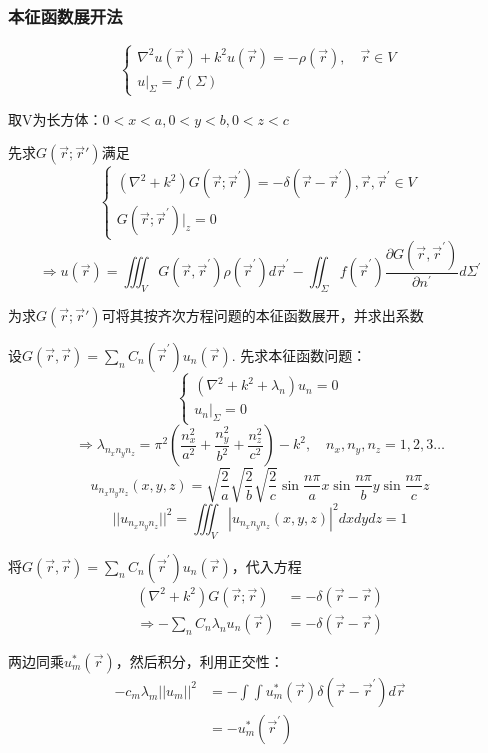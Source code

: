 \subsubsection{本征函数展开法}
\begin{ex}
$$\begin{cases}\nabla^{2}u(\vec{r})+k^{2}u(\vec{r})=-\rho(\vec{r}),\quad\vec{r}\in V\\u|_{\Sigma}=f(\Sigma)\end{cases}$$

取V为长方体：$0<x<a, 0<y<b, 0<z<c$

先求$G(\vec{r};\vec{r}')$满足
$$\begin{cases}(\nabla^{2}+k^{2})G(\vec{r};\vec{r}^{\prime})=-\delta(\vec{r}-\vec{r}^{\prime}),\vec{r},\vec{r}^{\prime}\in V\\G(\vec{r};\vec{r}^{\prime})|_{z}=0\end{cases}$$
$$\Rightarrow u(\vec{r})=\iiint_{V}G(\vec{r},\vec{r}^{\prime})\rho(\vec{r}^{\prime})d\vec{r}^{\prime}-\iint_{\Sigma}f(\vec{r}^{\prime})\frac{\partial G(\vec{r},\vec{r}^{\prime})}{\partial n^{\prime}}d\Sigma^{\prime}$$

为求$G(\vec{r};\vec{r}')$可将其按齐次方程问题的本征函数展开，并求出系数

设$G(\vec{r},\vec{r})=\sum_{n}C_{n}(\vec{r}^{\prime})u_{n}(\vec{r})$. 先求本征函数问题：$$\begin{cases}(\nabla^{2}+k^{2}+\lambda_{n})u_{n}=0\\u_{n}|_{\Sigma}=0\end{cases}$$
$$\Rightarrow\lambda_{n_{x}n_{y}n_{z}}=\pi^{2}(\frac{n_{x}^{2}}{a^{2}}+\frac{n_{y}^{2}}{b^{2}}+\frac{n_{z}^{2}}{c^{2}})-k^{2},\quad n_x,n_y,n_z=1,2,3\ldots $$
$$u_{n_{x}n_{y}n_{z}}(x,y,z)=\sqrt{\frac{2}{a}}\sqrt{\frac{2}{b}}\sqrt{\frac{2}{c}}\sin\frac{n\pi}{a}x\sin\frac{n\pi}{b}y\sin\frac{n\pi}{c}z$$
$$||u_{n_{x}n_{y}n_{z}}||^{2}=\iiint_V|u_{n_{x}n_{y}n_{z}}(x,y,z)|^{2}dxdydz=1$$

将$G(\vec{r},\vec{r})=\sum_{n}C_{n}(\vec{r}^{\prime})u_{n}(\vec{r})$，代入方程
$$\begin{aligned}
    (\nabla^{2}+k^{2})G(\vec{r};\vec{r})&=-\delta(\vec{r}-\vec{r})\\
    \Rightarrow-\sum_{n}C_{n}\lambda_{n}u_{n}(\vec{r})&=-\delta(\vec{r}-\vec{r})
\end{aligned}$$

两边同乘$u_m^*(\vec{r})$，然后积分，利用正交性：
$$\begin{aligned}-c_{m}\lambda_{m}||u_{m}||^{2}&=-\int\int u_{m}^{*}(\vec{r})\delta(\vec{r}-\vec{r}^{\prime})d\vec{r}\\&=-u_{m}^{*}(\vec{r}^{\prime})\end{aligned}$$


\end{ex}
